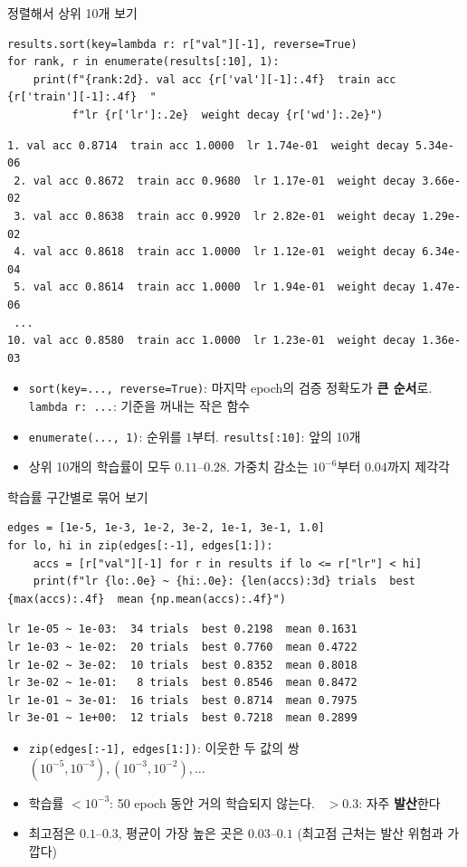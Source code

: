 \documentclass[aspectratio=169,11pt]{beamer}
\newcommand{\codesmall}{\ttfamily\fontsize{7.4}{8.3}\selectfont}
\newcommand{\code}[1]{\texttt{#1}}
\begin{document}
\begin{frame}[fragile]{정렬해서 상위 10개 보기}
\begin{lstlisting}
results.sort(key=lambda r: r["val"][-1], reverse=True)
for rank, r in enumerate(results[:10], 1):
    print(f"{rank:2d}. val acc {r['val'][-1]:.4f}  train acc {r['train'][-1]:.4f}  "
          f"lr {r['lr']:.2e}  weight decay {r['wd']:.2e}")
\end{lstlisting}
\begin{lstlisting}[style=outstyle,basicstyle=\codesmall]
 1. val acc 0.8714  train acc 1.0000  lr 1.74e-01  weight decay 5.34e-06
 2. val acc 0.8672  train acc 0.9680  lr 1.17e-01  weight decay 3.66e-02
 3. val acc 0.8638  train acc 0.9920  lr 2.82e-01  weight decay 1.29e-02
 4. val acc 0.8618  train acc 1.0000  lr 1.12e-01  weight decay 6.34e-04
 5. val acc 0.8614  train acc 1.0000  lr 1.94e-01  weight decay 1.47e-06
 ...
10. val acc 0.8580  train acc 1.0000  lr 1.23e-01  weight decay 1.36e-03
\end{lstlisting}
\small
\begin{itemize}
\item \code{sort(key=..., reverse=True)}: 마지막 epoch의 검증 정확도가 \textbf{큰 순서}로. \code{lambda r: ...}: 기준을 꺼내는 작은 함수
\item \code{enumerate(..., 1)}: 순위를 $1$부터. \code{results[:10]}: 앞의 10개
\item 상위 10개의 학습률이 모두 $0.11$--$0.28$. 가중치 감소는 $10^{-6}$부터 $0.04$까지 제각각
\end{itemize}
\end{frame}

\begin{frame}[fragile]{학습률 구간별로 묶어 보기}
\begin{lstlisting}
edges = [1e-5, 1e-3, 1e-2, 3e-2, 1e-1, 3e-1, 1.0]
for lo, hi in zip(edges[:-1], edges[1:]):
    accs = [r["val"][-1] for r in results if lo <= r["lr"] < hi]
    print(f"lr {lo:.0e} ~ {hi:.0e}: {len(accs):3d} trials  best {max(accs):.4f}  mean {np.mean(accs):.4f}")
\end{lstlisting}
\begin{lstlisting}[style=outstyle]
lr 1e-05 ~ 1e-03:  34 trials  best 0.2198  mean 0.1631
lr 1e-03 ~ 1e-02:  20 trials  best 0.7760  mean 0.4722
lr 1e-02 ~ 3e-02:  10 trials  best 0.8352  mean 0.8018
lr 3e-02 ~ 1e-01:   8 trials  best 0.8546  mean 0.8472
lr 1e-01 ~ 3e-01:  16 trials  best 0.8714  mean 0.7975
lr 3e-01 ~ 1e+00:  12 trials  best 0.7218  mean 0.2899
\end{lstlisting}
\small
\begin{itemize}
\item \code{zip(edges[:-1], edges[1:])}: 이웃한 두 값의 쌍 $(10^{-5},10^{-3}), (10^{-3},10^{-2}), \ldots$
\item 학습률 $<10^{-3}$: 50 epoch 동안 거의 학습되지 않는다. \ $>0.3$: 자주 \textbf{발산}한다
\item 최고점은 $0.1$--$0.3$, 평균이 가장 높은 곳은 $0.03$--$0.1$ (최고점 근처는 발산 위험과 가깝다)
\end{itemize}
\end{frame}
\end{document}
